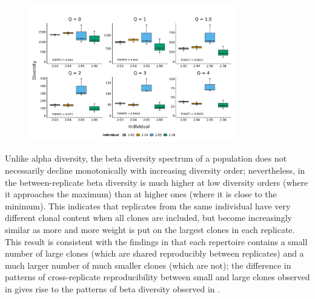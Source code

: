 \begin{figure}
\centering
\includegraphics[width = 0.8\textwidth]{_Figures/png/pilot-clone-diversity-solo-box}
\label{fig:igseq-pilot-clone-diversity-solo-box}
\end{figure}

Unlike alpha diversity, the beta diversity spectrum of a population does not necessarily decline monotonically with increasing diversity order; nevertheless, in  the between-replicate beta diversity is much higher at low diversity orders (where it approaches the maximum) than at higher ones (where it is close to the minimum). This indicates that replicates from the same individual have very different clonal content when all clones are included, but become increasingly similar as more and more weight is put on the largest clones in each replicate. This result is consistent with the findings in  that each repertoire contains a small number of large clones (which are shared reproducibly between replicates) and a much larger number of much smaller clones (which are not); the difference in patterns of cross-replicate reproducibility between small and large clones observed in  gives rise to the patterns of beta diversity observed in .


